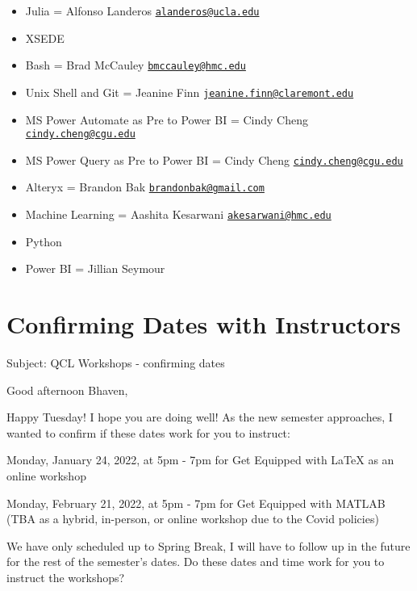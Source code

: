 \documentclass[
]{book}
\providecommand{\tightlist}{%
  \setlength{\itemsep}{0pt}\setlength{\parskip}{0pt}}
\begin{document}
\begin{itemize}
  \begin{itemize}
  \tightlist
  \item
    Julia = Alfonso Landeros \href{mailto:alanderos@ucla.edu}{\nolinkurl{alanderos@ucla.edu}}
  \item
    XSEDE
  \item
    Bash = Brad McCauley \href{mailto:bmccauley@hmc.edu}{\nolinkurl{bmccauley@hmc.edu}}
  \item
    Unix Shell and Git = Jeanine Finn \href{mailto:jeanine.finn@claremont.edu}{\nolinkurl{jeanine.finn@claremont.edu}}
  \item
    MS Power Automate as Pre to Power BI = Cindy Cheng \href{mailto:cindy.cheng@cgu.edu}{\nolinkurl{cindy.cheng@cgu.edu}}
  \item
    MS Power Query as Pre to Power BI = Cindy Cheng \href{mailto:cindy.cheng@cgu.edu}{\nolinkurl{cindy.cheng@cgu.edu}}
  \item
    Alteryx = Brandon Bak \href{mailto:brandonbak@gmail.com}{\nolinkurl{brandonbak@gmail.com}}
  \item
    Machine Learning = Aashita Kesarwani \href{mailto:akesarwani@hmc.edu}{\nolinkurl{akesarwani@hmc.edu}}
  \item
    Python
  \item
    Power BI = Jillian Seymour
  \end{itemize}
\end{itemize}

\hypertarget{confirming-dates-with-instructors}{%
\section{Confirming Dates with Instructors}\label{confirming-dates-with-instructors}}

Subject: QCL Workshops - confirming dates

Good afternoon Bhaven,

Happy Tuesday! I hope you are doing well! As the new semester approaches, I wanted to confirm if these dates work for you to instruct:

Monday, January 24, 2022, at 5pm - 7pm for Get Equipped with LaTeX as an online workshop

Monday, February 21, 2022, at 5pm - 7pm for Get Equipped with MATLAB (TBA as a hybrid, in-person, or online workshop due to the Covid policies)

We have only scheduled up to Spring Break, I will have to follow up in the future for the rest of the semester's dates. Do these dates and time work for you to instruct the workshops?
\end{document}
